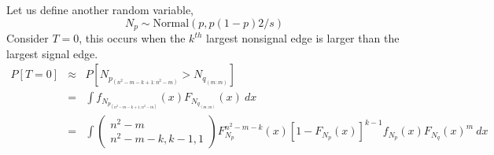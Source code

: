 \documentclass{article}
\begin{document}
Let us define another random variable,
\[
N_p\sim \textrm{Normal}(p, p(1-p)2/s)
\]
%
Consider $T=0$, this occurs when the $k^{th}$ largest nonsignal edge is larger than the largest signal edge.
\begin{eqnarray}
P[T=0]
&\approx&
P[  N_{p_{(n^2-m-k+1:n^2-m)}} > N_{q_{(m:m)}}]
\\&=&
    \int
         f_{N_{p_{(n^2-m-k+1:n^2-m)}}}(x) F_{N_{q_{(m:m)}}}(x)
    \ dx
\\&=&
    \int
         \left(\begin{matrix} n^2-m \\ n^2-m-k, k-1, 1 \end{matrix}\right) F_{N_{p}}^{n^2-m-k}(x) [1-F_{N_{p}}(x)]^{k-1} f_{N_{p}}(x)
       F_{N_{q}}(x)^m
    \ dx
\end{eqnarray}
\end{document}
